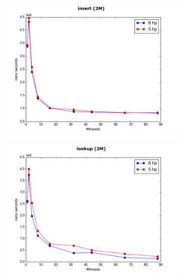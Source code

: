 \documentclass[conference]{IEEEtran}
\begin{document}
	
	\begin{figure}
		\begin{subfigure}{.5\textwidth}
			\includegraphics[width=0.45\paperwidth]{hp_comapre/insert_2M.png}
			\label{fig:hp_insert}			
		\end{subfigure}
		\begin{subfigure}{.5\textwidth}
			\includegraphics[width=0.45\paperwidth]{hp_comapre/lookup_2M.png}	
			\label{fig:hp_lookup}
		\end{subfigure}
		\begin{subfigure}{.5\textwidth}

\end{subfigure}
\end{figure}
\end{document}
